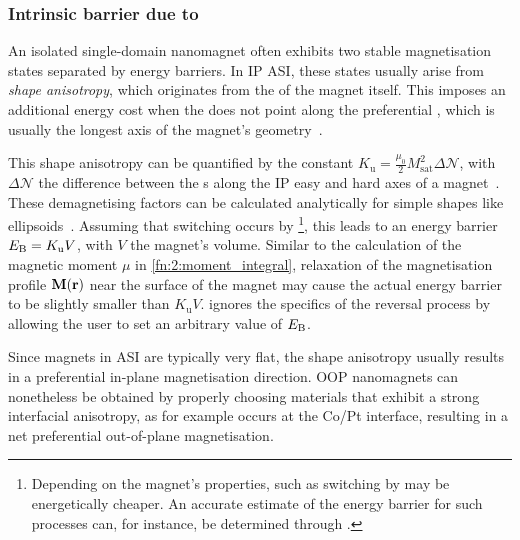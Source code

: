 \subsubsection{Intrinsic barrier due to }\label{sec:2:shape_anisotropy}
An isolated single-domain nanomagnet often exhibits two stable magnetisation states separated by energy barriers.
In IP ASI, these states usually arise from \textit{shape anisotropy}, which originates from the  of the magnet itself.
This imposes an additional energy cost when the  does not point along the preferential , which is usually the longest axis of the magnet's geometry~\cite{PhD_Leliaert}. \par
This shape anisotropy can be quantified by the  constant $K_\mathrm{u} = \frac{\mu_0}{2} M_\mathrm{sat}^2 \Delta \mathcal{N}$, with $\Delta \mathcal{N}$ the difference between the s along the IP easy and hard axes of a magnet~\cite{AdvancesASI,VogelFulcherTammannFreezing,andersson2016thermally}. %
These demagnetising factors can be calculated analytically for simple shapes like ellipsoids~\cite{EllipsoidDemag,EllipseDemag}.
Assuming that switching occurs by \footnote{
	Depending on the magnet's properties,  such as switching by  may be energetically cheaper.
	An accurate estimate of the energy barrier for such processes can, for instance, be determined through .
}, this leads to an energy barrier $E_\mathrm{B} = K_\mathrm{u} V$, with $V$ the magnet's volume.
Similar to the calculation of the magnetic moment $\mu$ in \cref{fn:2:moment_integral}, relaxation of the magnetisation profile $\boldsymbol{\mathbf{M}}(\boldsymbol{\mathbf{r}})$ near the surface of the magnet may cause the actual energy barrier to be slightly smaller than $K_\mathrm{u} V$.
\hotspice ignores the specifics of the reversal process by allowing the user to set an arbitrary value of $E_\mathrm{B}$. \par
Since magnets in ASI are typically very flat, the shape anisotropy usually results in a preferential in-plane magnetisation direction.
OOP nanomagnets can nonetheless be obtained by properly choosing materials that exhibit a strong interfacial anisotropy, as for example occurs at the Co/Pt interface, resulting in a net preferential out-of-plane magnetisation.

